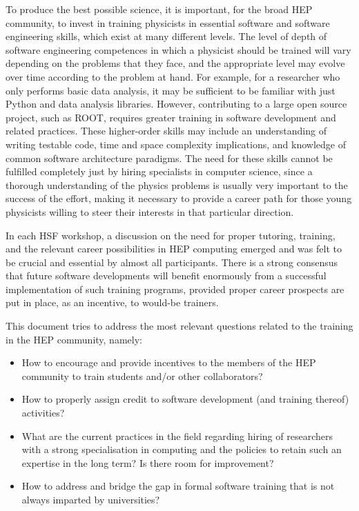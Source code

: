 \documentclass[12pt,a4paper]{article}
\begin{document}
To produce the best possible science, it is important, for the broad HEP
community, to invest in training physicists in essential software and software
engineering skills, which exist at many different levels. The level of depth of
software engineering competences in which a physicist should be trained will
vary depending on the problems that they face, and the appropriate level may
evolve over time according to the problem at hand. For example, for a researcher
who only performs basic data analysis, it may be sufficient to be familiar with
just Python and data analysis libraries. However, contributing to a large open
source project, such as ROOT, requires greater training in software development
and related practices. These higher-order skills may include an understanding of
writing testable code, time and space complexity implications, and knowledge of
common software architecture paradigms. The need for these skills cannot be
fulfilled completely just by hiring specialists in computer science, since a
thorough understanding of the physics problems is usually very important to the
success of the effort, making it necessary to provide a career path for those
young physicists willing to steer their interests in that particular direction.

In each HSF workshop, a discussion on the need for proper tutoring, training,
and the relevant career possibilities in HEP computing emerged and was felt to
be crucial and essential by almost all participants. There is a strong consensus
that future software developments will benefit enormously from a successful
implementation of such training programs, provided proper career prospects are
put in place, as an incentive, to would-be trainers.

This document tries to address the most relevant questions related to the
training in the HEP community, namely:
\begin{itemize}
    \item How to encourage and provide incentives to the members of the HEP 
    community to train students and/or other collaborators?
    \item How to properly assign credit to software development (and training 
    thereof) activities?
    \item What are the current practices in the field regarding hiring of 
    researchers with a strong specialisation in computing and the policies 
    to retain such an expertise in the long term? Is there room for improvement?
    \item How to address and bridge the gap in formal software training that 
    is not always imparted by universities?
\end{itemize}
\end{document}

